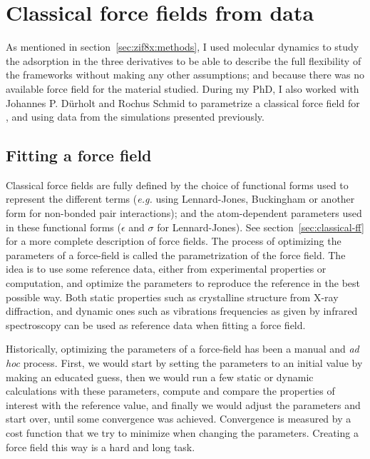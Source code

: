 \documentclass[thesis]{subfiles}
\begin{document}
\clearpage
\section{Classical force fields from \abinitio data}
\label{sec:classical-ff-parametrize}

As mentioned in section~\ref{sec:zif8x:methods}, I used \abinitio molecular
dynamics to study the adsorption in the three  derivatives to be able to
describe the full flexibility of the frameworks without making any other
assumptions; and because there was no available force field for the material
studied. During my PhD, I also worked with Johannes P. Dürholt and Rochus Schmid
to parametrize a classical force field for , \ZIFCl and \ZIFBr using data
from the \abinitio simulations presented previously.

\subsection{Fitting a force field}

Classical force fields are fully defined by the choice of functional forms used
to represent the different terms (\emph{e.g.} using Lennard-Jones, Buckingham or
another form for non-bonded pair interactions); and the atom-dependent
parameters used in these functional forms ($\epsilon$ and $\sigma$ for
Lennard-Jones). See section~\ref{sec:classical-ff} for a more complete
description of force fields. The process of optimizing the parameters of a
force-field is called the parametrization of the force field. The idea is to use
some reference data, either from experimental properties or \abinitio
computation, and optimize the parameters to reproduce the reference in the best
possible way. Both static properties such as crystalline structure from X-ray
diffraction, and dynamic ones such as vibrations frequencies as given by
infrared spectroscopy can be used as reference data when fitting a force field.

Historically, optimizing the parameters of a force-field has been a manual and
\emph{ad hoc} process. First, we would start by setting the parameters to an
initial value by making an educated guess, then we would run a few static or
dynamic calculations with these parameters, compute and compare the properties
of interest with the reference value, and finally we would adjust the parameters
and start over, until some convergence was achieved. Convergence is measured by
a cost function that we try to minimize when changing the parameters. Creating a
force field this way is a hard and long task.
\end{document}
